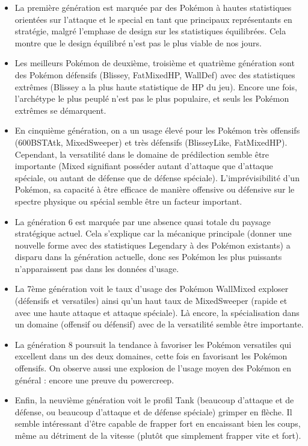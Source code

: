 \documentclass[a4paper,12pt]{article}
\begin{document}
\begin{itemize}
    \item La première génération est marquée par des Pokémon à hautes
    statistiques orientées sur l'attaque et le special en tant que principaux
    représentants en stratégie, malgré l'emphase de design sur les statistiques
    équilibrées. Cela montre que le design équilibré n'est pas le plus viable de
    nos jours.
    \item Les meilleurs Pokémon de deuxième, troisième et quatrième génération
    sont des Pokémon défensifs (Blissey, FatMixedHP, WallDef) avec des
    statistiques extrêmes (Blissey a la plus haute statistique de HP du jeu).
    Encore une fois, l'archétype le plus peuplé n'est pas le plus populaire, et
    seuls les Pokémon extrêmes se démarquent.
    \item En cinquième génération, on a un usage élevé pour les Pokémon très
    offensifs (600BSTAtk, MixedSweeper) et très défensifs (BlisseyLike,
    FatMixedHP). Cependant, la versatilité dans le domaine de prédilection
    semble être importante (Mixed signifiant posséder autant d'attaque que
    d'attaque spéciale, ou autant de défense que de défense spéciale).
    L'imprévisibilité d'un Pokémon, sa capacité à être efficace de manière
    offensive ou défensive sur le spectre physique ou spécial semble être un
    facteur important.
    \item La génération 6 est marquée par une absence quasi totale du paysage
    stratégique actuel. Cela s'explique car la mécanique principale (donner une
    nouvelle forme avec des statistiques Legendary à des Pokémon existants) a
    disparu dans la génération actuelle, donc ses Pokémon les plus puissants
    n'apparaissent pas dans les données d'usage.
    \item La 7ème génération voit le taux d'usage des Pokémon WallMixed exploser
    (défensifs et versatiles) ainsi qu'un haut taux de MixedSweeper (rapide et
    avec une haute attaque et attaque spéciale). Là encore, la spécialisation
    dans un domaine (offensif ou défensif) avec de la versatilité semble être
    importante.
    \item La génération 8 poursuit la tendance à favoriser les Pokémon
    versatiles qui excellent dans un des deux domaines, cette fois en favorisant
    les Pokémon offensifs. On observe aussi une explosion de l'usage moyen des
    Pokémon en général : encore une preuve du powercreep.
    \item Enfin, la neuvième génération voit le profil Tank (beaucoup d'attaque
    et de défense, ou beaucoup d'attaque et de défense spéciale) grimper en
    flèche. Il semble intéressant d'être capable de frapper fort en encaissant
    bien les coups, même au détriment de la vitesse (plutôt que simplement
    frapper vite et fort).
    
\end{itemize}
\end{document}
